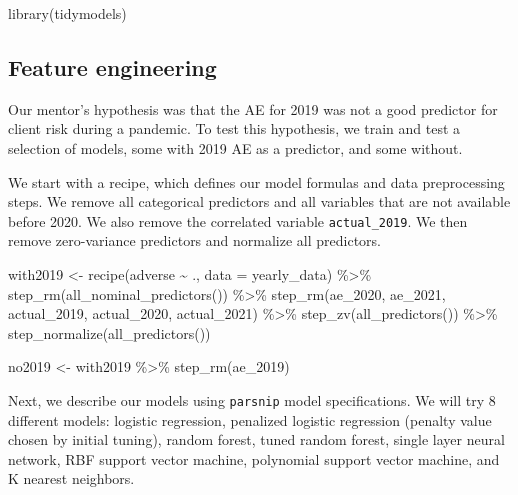 \documentclass[
]{article}
\newenvironment{Shaded}{\begin{snugshade}}{\end{snugshade}}
\newcommand{\AttributeTok}[1]{\textcolor[rgb]{0.77,0.63,0.00}{#1}}
\newcommand{\FunctionTok}[1]{\textcolor[rgb]{0.00,0.00,0.00}{#1}}
\newcommand{\NormalTok}[1]{#1}
\newcommand{\OtherTok}[1]{\textcolor[rgb]{0.56,0.35,0.01}{#1}}
\newcommand{\SpecialCharTok}[1]{\textcolor[rgb]{0.00,0.00,0.00}{#1}}
\begin{document}
\begin{Shaded}
\begin{Highlighting}[]
\FunctionTok{library}\NormalTok{(tidymodels)}
\end{Highlighting}
\end{Shaded}

\hypertarget{feature-engineering}{%
\subsection{Feature engineering}\label{feature-engineering}}

Our mentor's hypothesis was that the AE for 2019 was not a good
predictor for client risk during a pandemic. To test this hypothesis, we
train and test a selection of models, some with 2019 AE as a predictor,
and some without.

We start with a recipe, which defines our model formulas and data
preprocessing steps. We remove all categorical predictors and all
variables that are not available before 2020. We also remove the
correlated variable \texttt{actual\_2019}. We then remove zero-variance
predictors and normalize all predictors.

\begin{Shaded}
\begin{Highlighting}[]
\NormalTok{with2019 }\OtherTok{\textless{}{-}}
  \FunctionTok{recipe}\NormalTok{(adverse }\SpecialCharTok{\textasciitilde{}}\NormalTok{ ., }\AttributeTok{data =}\NormalTok{ yearly\_data) }\SpecialCharTok{\%\textgreater{}\%}
  \FunctionTok{step\_rm}\NormalTok{(}\FunctionTok{all\_nominal\_predictors}\NormalTok{()) }\SpecialCharTok{\%\textgreater{}\%}
  \FunctionTok{step\_rm}\NormalTok{(ae\_2020, ae\_2021, actual\_2019, actual\_2020, actual\_2021) }\SpecialCharTok{\%\textgreater{}\%}
  \FunctionTok{step\_zv}\NormalTok{(}\FunctionTok{all\_predictors}\NormalTok{()) }\SpecialCharTok{\%\textgreater{}\%}
  \FunctionTok{step\_normalize}\NormalTok{(}\FunctionTok{all\_predictors}\NormalTok{())}

\NormalTok{no2019 }\OtherTok{\textless{}{-}}
\NormalTok{  with2019 }\SpecialCharTok{\%\textgreater{}\%}
  \FunctionTok{step\_rm}\NormalTok{(ae\_2019)}
\end{Highlighting}
\end{Shaded}

Next, we describe our models using \texttt{parsnip} model
specifications. We will try 8 different models: logistic regression,
penalized logistic regression (penalty value chosen by initial tuning),
random forest, tuned random forest, single layer neural network, RBF
support vector machine, polynomial support vector machine, and K nearest
neighbors.
\end{document}

